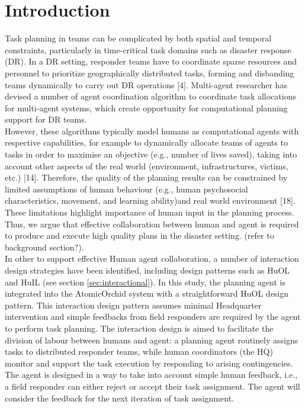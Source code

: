 \section{Introduction}\label{sec:studytwointroduction}
Task planning in teams can be complicated by both spatial and temporal constraints, particularly in time-critical task domains such as disaster response (DR). In a DR setting, responder teams have to coordinate sparse resources and personnel to prioritize geographically distributed tasks, forming and disbanding teams dynamically to carry out DR operations [4]. Multi-agent researcher has devised a number of agent coordination algorithm to coordinate task allocations for multi-agent systems, which create opportunity for computational planning support for DR teams. \\

However, these algorithms typically model humans as computational agents with respective capabilities, for example to dynamically allocate teams of agents to tasks in order to maximise an objective (e.g., number of lives saved), taking into account other aspects of the real world (environment, infrastructures, victims, etc.) [14]. Therefore, the quality of the planning results can be constrained by limited assumptions of human behaviour (e.g., human psychosocial characteristics, movement, and learning ability)and real world environment [18]. These limitations highlight importance of human input in the planning process. Thus, we argue that effective collaboration between human and agent is required to produce and execute high quality plans in the disaster setting. (refer to background section?). \\

In other to support effective Human agent collaboration, a number of interaction design strategies have been identified, including design patterns such as HuOL and HuIL (see section \ref{sec:interactional}). In this study, the planning agent is integrated into the AtomicOrchid system with a straightforward HuOL design pattern. This interaction design pattern assumes minimal Headquarter intervention and simple feedbacks from field responders are required by the agent to perform task planning. The interaction design is aimed to facilitate the division of labour between humans and agent: a planning agent routinely assigns tasks to distributed responder teams, while human coordinators (the HQ) monitor and support the task execution by responding to arising contingencies. The agent is designed in a way to take into account simple human feedback, i.e., a field responder can either reject or accept their task assignment. The agent will consider the feedback for the next iteration of task assignment.\\

